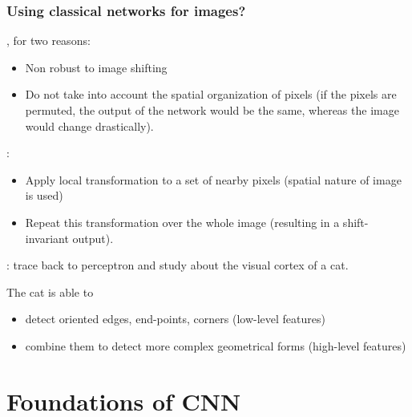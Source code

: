 \begin{frame}
	\frametitle{Using classical networks for images?}

, for two reasons:
	\begin{itemize}
		\item Non robust to image shifting
		\item Do not take into account the spatial organization of pixels (if the pixels are permuted, the output of the network would be the same, whereas the image would change drastically).
	\end{itemize}

\medskip

:
\begin{itemize}
	\item Apply local transformation to a set of nearby pixels (spatial nature of image is used)
	\item Repeat this transformation over the whole image (resulting in a shift-invariant output).
\end{itemize}

\medskip

: trace back to perceptron and study about the visual cortex of a cat.

The cat is able to
\begin{itemize}
	\item detect oriented edges, end-points, corners (low-level features)
	\item combine them to detect more complex geometrical forms (high-level features)
\end{itemize}



\end{frame}


\section{Foundations of CNN}



